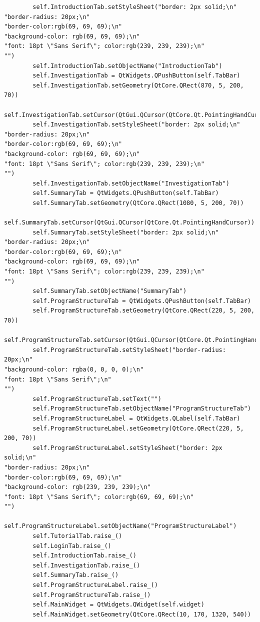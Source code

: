\documentclass{article}
\begin{document}
\begin{lstlisting}
        self.IntroductionTab.setStyleSheet("border: 2px solid;\n"
"border-radius: 20px;\n"
"border-color:rgb(69, 69, 69);\n"
"background-color: rgb(69, 69, 69);\n"
"font: 18pt \"Sans Serif\"; color:rgb(239, 239, 239);\n"
"")
        self.IntroductionTab.setObjectName("IntroductionTab")
        self.InvestigationTab = QtWidgets.QPushButton(self.TabBar)
        self.InvestigationTab.setGeometry(QtCore.QRect(870, 5, 200, 70))
        self.InvestigationTab.setCursor(QtGui.QCursor(QtCore.Qt.PointingHandCursor))
        self.InvestigationTab.setStyleSheet("border: 2px solid;\n"
"border-radius: 20px;\n"
"border-color:rgb(69, 69, 69);\n"
"background-color: rgb(69, 69, 69);\n"
"font: 18pt \"Sans Serif\"; color:rgb(239, 239, 239);\n"
"")
        self.InvestigationTab.setObjectName("InvestigationTab")
        self.SummaryTab = QtWidgets.QPushButton(self.TabBar)
        self.SummaryTab.setGeometry(QtCore.QRect(1080, 5, 200, 70))
        self.SummaryTab.setCursor(QtGui.QCursor(QtCore.Qt.PointingHandCursor))
        self.SummaryTab.setStyleSheet("border: 2px solid;\n"
"border-radius: 20px;\n"
"border-color:rgb(69, 69, 69);\n"
"background-color: rgb(69, 69, 69);\n"
"font: 18pt \"Sans Serif\"; color:rgb(239, 239, 239);\n"
"")
        self.SummaryTab.setObjectName("SummaryTab")
        self.ProgramStructureTab = QtWidgets.QPushButton(self.TabBar)
        self.ProgramStructureTab.setGeometry(QtCore.QRect(220, 5, 200, 70))
        self.ProgramStructureTab.setCursor(QtGui.QCursor(QtCore.Qt.PointingHandCursor))
        self.ProgramStructureTab.setStyleSheet("border-radius: 20px;\n"
"background-color: rgba(0, 0, 0, 0);\n"
"font: 18pt \"Sans Serif\";\n"
"")
        self.ProgramStructureTab.setText("")
        self.ProgramStructureTab.setObjectName("ProgramStructureTab")
        self.ProgramStructureLabel = QtWidgets.QLabel(self.TabBar)
        self.ProgramStructureLabel.setGeometry(QtCore.QRect(220, 5, 200, 70))
        self.ProgramStructureLabel.setStyleSheet("border: 2px solid;\n"
"border-radius: 20px;\n"
"border-color:rgb(69, 69, 69);\n"
"background-color: rgb(239, 239, 239);\n"
"font: 18pt \"Sans Serif\"; color:rgb(69, 69, 69);\n"
"")
        self.ProgramStructureLabel.setObjectName("ProgramStructureLabel")
        self.TutorialTab.raise_()
        self.LoginTab.raise_()
        self.IntroductionTab.raise_()
        self.InvestigationTab.raise_()
        self.SummaryTab.raise_()
        self.ProgramStructureLabel.raise_()
        self.ProgramStructureTab.raise_()
        self.MainWidget = QtWidgets.QWidget(self.widget)
        self.MainWidget.setGeometry(QtCore.QRect(10, 170, 1320, 540))

\end{lstlisting}
\end{document}
